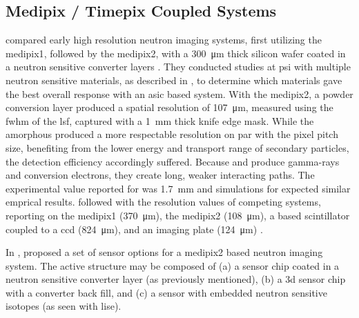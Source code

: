 \documentclass[../../../main.tex]{subfiles}%
\begin{document}
%
    \subsection{Medipix / Timepix Coupled Systems}%
    \label{sec:chapter-2:advanced-detectors:timepix-systems}%
    \citeauthor*{Jakubek_2004} compared early high resolution neutron imaging systems, first utilizing the \gls{medipix1}, followed by the \gls{medipix2}, with a \SI{300}{\micro\meter} thick silicon wafer coated in a neutron sensitive converter layers \cite{Llopart_2003}.
    They conducted studies at \gls{psi} with multiple neutron sensitive materials, as described in , to determine which materials gave the best overall response with an \gls{asic} based system.
    With the \gls{medipix2}, a  powder conversion layer produced a spatial resolution of \SI{107}{\micro\meter}, measured using the \gls{fwhm} of the \gls{lsf}, captured with a \SI{1}{\milli\meter} thick  knife edge mask.
    While the amorphous  produced a more respectable resolution on par with the pixel pitch size, benefiting from the lower energy and transport range of secondary particles, the detection efficiency accordingly suffered.
    Because  and  produce \glspl{gamma-ray} and conversion electrons, they create long, weaker interacting paths.
    The experimental value reported for  was \SI{1.7}{\milli\meter} and simulations for  expected similar emprical results.
    \citeauthor*{Uher_2005} followed with the resolution values of competing systems, reporting on the \gls{medipix1} (\SI{370}{\micro\meter}), the \gls{medipix2} (\SI{108}{\micro\meter}), a  based scintillator coupled to a \gls{ccd} (\SI{824}{\micro\meter}), and an imaging plate (\SI{124}{\micro\meter}) \cite{Jakubek_2004, Jakubek_2005, Uher_2005, Jakubek_2006a}.
    \par%
    In \citeyear*{Jakubek_2007}, \citeauthor*{Jakubek_2007} proposed a set of sensor options for a \gls{medipix2} based neutron imaging system.
    The active structure may be composed of (a) a sensor chip coated in a neutron sensitive converter layer (as previously mentioned), (b) a \gls{3d} sensor chip with a converter back fill, and (c) a sensor with embedded neutron sensitive isotopes (as seen with \gls{lise}).
\end{document}
